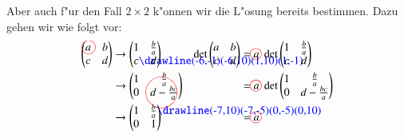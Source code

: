 Aber auch f"ur den Fall $2\times 2$ k"onnen wir die L"osung
bereits bestimmen. Dazu gehen wir wie folgt vor:
\begin{align*}
\begin{pmatrix}
a%
\begin{picture}(0,0)
\color{red}\put(-2,3){\circle{12}}
\end{picture}%
&b\\
c&d%
\end{pmatrix}
&\rightarrow
\begin{pmatrix}1&\frac{b}{a}\\
c%
\begin{picture}(0,0)
\color{blue}\drawline(-6,-1)(-6,10)(1,10)(1,-1)
\end{picture}%
&d\end{pmatrix}
&\det \begin{pmatrix}a&b\\c&d\end{pmatrix}
&=a%
\begin{picture}(0,0)
\color{red}\put(-3,3){\circle{10}}
\end{picture}%
\;
\det
\begin{pmatrix}1&\frac{b}{a}\\c&d\end{pmatrix}
\\
&\rightarrow
\begin{pmatrix}1&\frac{b}{a}\\0&d-\frac{bc}{a}%
\begin{picture}(0,0)
\color{red}\put(-15,3){\circle{28}}
\end{picture}%
\end{pmatrix}
&
&=a%
\begin{picture}(0,0)
\color{red}\put(-3,3){\circle{10}}
\end{picture}%
\;\det\begin{pmatrix}1&\frac{b}{a}\\0&d-\frac{bc}{a}\end{pmatrix}
\\
&\rightarrow
\begin{pmatrix}1&\frac{b}{a}%
\begin{picture}(0,0)
\color{blue}\drawline(-7,10)(-7,-5)(0,-5)(0,10)
\end{picture}%
\\0&1\end{pmatrix}
&
&=a%
\begin{picture}(0,0)
\color{red}\put(-3,3){\circle{10}}
\end{picture}%

\end{align*}
